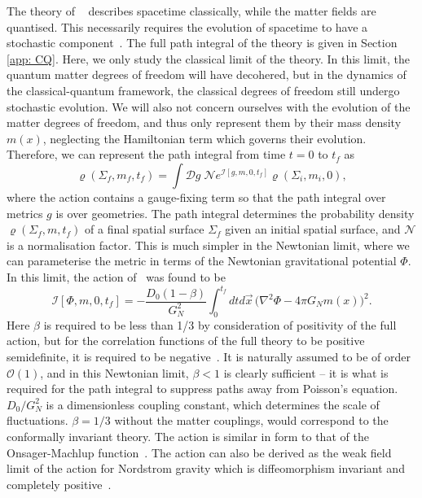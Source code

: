 \documentclass[aps,pra,amsmath,amssymb,amsthm,floatfix,nofootinbib,notitlepage,superscriptaddress,10pt]{revtex4-2}
\def\actionC{\mathcal{I}}
\begin{document}
The theory of ~\cite{oppenheim2018post,oppenheim2023covariant} describes spacetime classically, while the matter fields are quantised. This necessarily requires the evolution of spacetime to have a stochastic component~\cite{oppenheim2023gravitationally}. The full path integral of the theory is given in Section \ref{app: CQ}. Here, we only study the classical limit of the theory. 
In this limit, the quantum
matter degrees of freedom will have decohered, but in the dynamics of the classical-quantum framework, the classical degrees of freedom still undergo stochastic evolution. 
We will also not concern ourselves with the evolution of the matter degrees of freedom, and thus only represent them by their mass density $m(x)$, neglecting the Hamiltonian term which governs their evolution.
Therefore, we can represent the path integral from time $t=0$ to $t_f$ as
\begin{equation}
    \label{eq: Newton_decohered_PI}
    \varrho(\Sigma_f,m_f,t_f)= \int \mathcal{D}g  \;\mathcal{N} e^{\actionC[g,m,0,t_f]}  \varrho(\Sigma_i,m_i,0), 
    \end{equation}
    where the action contains a gauge-fixing term so that the path integral over metrics $g$ is over geometries. The path
integral determines the probability density $\varrho(\Sigma_f,m,t_f)$ of a final spatial surface $\Sigma_f$ given an initial spatial surface,
and $\mathcal{N}$ is a normalisation factor. This is much simpler in the Newtonian limit, where we can parameterise the metric
in terms of the Newtonian gravitational potential $\Phi$. In this limit, the action of~\cite{oppenheim2023covariant} was found to be~\cite{layton2023weak}
\begin{equation}
\label{eq:main-isotropic_zero_order}
    \actionC[\Phi,m,0,t_f] = -\frac{D_0(1-\beta)}{G_N^2}\int_{0}^{t_f} dtd\vec{x}\, \big( \nabla^2 \Phi - 4\pi G_N m(x)\big)^2 .
\end{equation}
Here $\beta$ is required to be less than 1/3 by consideration of positivity of the full action, but for the correlation functions of the full theory to be positive semidefinite, it is required to be negative~\cite{grudka2023renormalisable}. It is naturally assumed to be of order $\mathcal{O}(1)$, and in this Newtonian limit, $\beta<1$ is clearly sufficient -- it is what is required for the path integral to suppress paths away from Poisson's equation. $D_0/G_N^2$ is a dimensionless coupling constant, which determines the scale of fluctuations. $\beta=1/3$ without the matter couplings, would correspond to the conformally invariant theory. The action is similar in form to that of the Onsager-Machlup function~\cite{Onsager1953Fluctuations}. The action can also be derived as the weak field limit of  the action for Nordstrom gravity which is diffeomorphism invariant and completely positive~\cite{UCLNordstrom}. 
\end{document}
